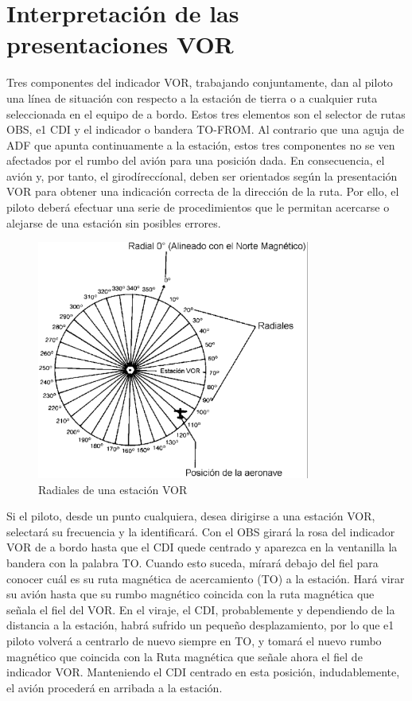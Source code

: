 
\section{Interpretación de las presentaciones VOR}

Tres componentes del indicador VOR, trabajando conjuntamente, dan al piloto una línea de situación con respecto a la estación de tierra o a cualquier ruta seleccionada en el equipo de a bordo. Estos tres elementos son el selector de rutas OBS, e1 CDI y el indicador o bandera TO-FROM. Al contrario que una aguja de ADF que apunta continuamente a la estación, estos tres componentes no se ven afectados por el rumbo del avión para una posición dada. En consecuencia, el avión y, por tanto, el girodíreccíonal, deben ser orientados según la presentación VOR para obtener una indicación correcta de la dirección de la ruta. Por ello, el piloto deberá efectuar una serie de procedimientos que le permitan acercarse o alejarse de una estación sin posibles errores.

\begin{figure}[htb]
  \centering
\includegraphics[keepaspectratio,width=0.8\textwidth]{Imagenes/06.02.vor.imagenes/radiales-vor.eps}
  \caption{Radiales de una estación VOR}
  \label{fig:radiales-vor}
\end{figure}


Si el piloto, desde un punto cualquiera, desea dirigirse a una estación VOR, selectará su frecuencia y la identificará. Con el OBS girará la rosa del indicador VOR de a bordo hasta que el CDI quede centrado y aparezca en la ventanilla la bandera con la palabra TO. Cuando esto suceda, mírará debajo del fiel para conocer cuál es su ruta magnética de acercamiento (TO) a la estación. Hará virar su avión hasta que su rumbo magnético coincida con la ruta magnética que señala el fiel del VOR. En el viraje, el CDI, probablemente y dependiendo de la distancia a la estación, habrá sufrido un pequeño desplazamiento, por lo que e1 piloto volverá a centrarlo de nuevo siempre en TO, y tomará el nuevo rumbo magnético que coincida con la Ruta magnética que señale ahora el fiel de indicador VOR. Manteniendo el CDI centrado en esta posición, indudablemente, el avión procederá en arribada a la estación. 

